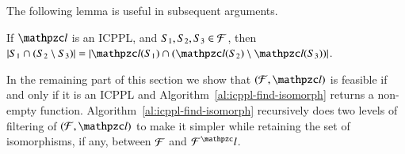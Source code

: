 \documentclass[MS,synopsis]{iitmdiss}
\begin{document}
\noindent
The following lemma is useful in subsequent arguments. 
\begin{lemma}
  \label{lem:setminuscard}
  If $\cl$ is an ICPPL, and $S_1, S_2, S_3 \in {\cal F}$, then $|S_1 \cap
  (S_2 \setminus S_3)| = |\cl(S_1) \cap (\cl(S_2) \setminus
  \cl(S_3))|$.
\end{lemma}



In the remaining part of this section we show that $(\cF, \cl)$ is
feasible if and only if it is an ICPPL and
Algorithm~\ref{al:icppl-find-isomorph} returns a non-empty
function. Algorithm~\ref{al:icppl-find-isomorph} recursively does two
levels of filtering of $(\cF, \cl)$ to make it simpler while retaining
the set of isomorphisms, if any, between ${\cal F}$ and $\cF^\cl$.
\end{document}
